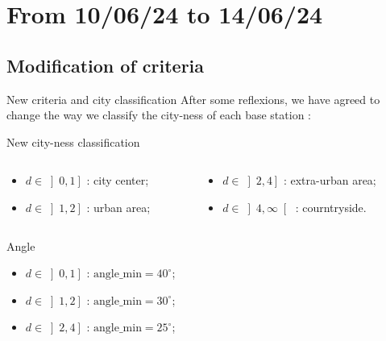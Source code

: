 \smallframetitle

\section{From 10/06/24 to 14/06/24}
\insertsectionframe

\subsection{Modification of criteria}
\insertsubsectionframe

\begin{frame}{New criteria and city classification}
    After some reflexions, we have agreed to change the way we classify the city-ness of each base station :
    \begin{block}{New city-ness classification}
        \begin{columns}
            \begin{column}{0.4\paperwidth}
                \begin{itemize}
                    \item $d\in\left]0, 1\right]$ : city center;
                    \item $d\in\left]1, 2\right]$ : urban area;
                \end{itemize}
            \end{column}
            \begin{column}{0.4\paperwidth}
                \begin{itemize}
                    \item $d\in\left]2, 4\right]$ : extra-urban area;
                    \item $d\in\left]4, \infty\right[$ : courntryside.
                \end{itemize}
            \end{column}
        \end{columns}
    \end{block}
    \begin{columns}
        \begin{column}{0.4\paperwidth}
            \begin{block}{Angle}
                \begin{itemize}
                    \item $d\in\left]0, 1\right]$ : $\text{angle\_min}=40^\circ$;
                    \item $d\in\left]1, 2\right]$ : $\text{angle\_min}=30^\circ$;
                    \item $d\in\left]2, 4\right]$ : $\text{angle\_min}=25^\circ$;

\end{itemize}
\end{block}
\end{column}
\end{columns}
\end{frame}
